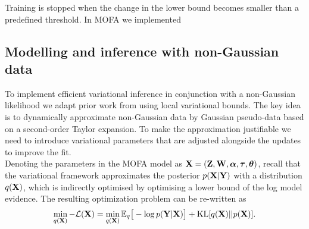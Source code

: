 Training is stopped when the change in the lower bound becomes smaller than a predefined threshold. In MOFA we implemented



\subsection{Modelling and inference with non-Gaussian data} \label{section:mofa_ngaussian}

To implement efficient variational inference in conjunction with a non-Gaussian likelihood we adapt prior work from \cite{Seeger2012} using local variational bounds. The key idea is to dynamically approximate non-Gaussian data by Gaussian pseudo-data based on a second-order Taylor expansion.  To make the approximation justifiable we need to introduce variational parameters that are adjusted alongside the updates to improve the fit.	\\
Denoting the parameters in the MOFA model as ${\bf X}= ({\bf Z},{\bf W},\mbox{\boldmath $\alpha$},\mbox{\boldmath $\tau$},\mbox{\boldmath $\theta$})$, recall that the variational framework approximates the posterior $p({\bf X} | {\bf Y} )$ with a distribution $q({\bf X})$, which is indirectly optimised by optimising a lower bound of the log model evidence. The resulting optimization problem can be re-written as
\begin{equation*}
\min_{q({\bf X})} -\mathcal{L}({\bf X}) =  \min_{q({\bf X})} \mathbb{E}_q \big[ -\log p({\bf Y}|{\bf X}) \big] + {\rm KL}[q({\bf X})||p({\bf X})].
\end{equation*}



